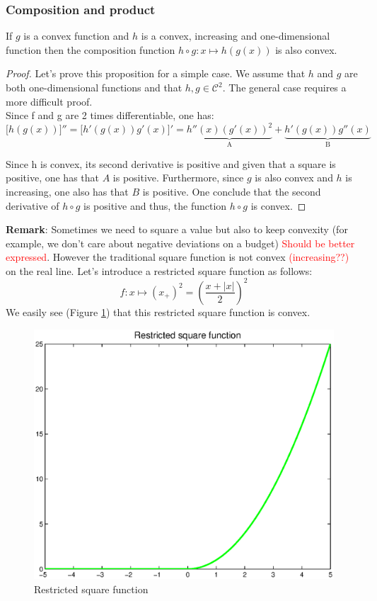 \subsubsection{Composition and product}
\begin{property}
If $g$ is a convex function and $h$ is a convex, increasing and one-dimensional function then the composition function $h \circ g: x \mapsto h(g(x))$ is also convex. 
\end{property}
\begin{proof}
Let's prove this proposition for a simple case. We assume that $h$ and $g$ are both one-dimensional functions and that $h,g \in \mathcal{C}^2$. The general case requires a more difficult proof. \\
Since f and g are 2 times differentiable, one has:
$$\big[ h(g(x))\big]'' = \big[ h'(g(x))g'(x)\big]' = \underbrace{h''(x)(g'(x))^2}_\text{A} + \underbrace{h'(g(x))g''(x)}_\text{B} $$

Since h is convex, its second derivative is positive and given that a square is positive, one has that $A$ is positive. Furthermore, since $g$ is also convex and $h$ is increasing, one also has that $B$ is positive. One conclude that the second derivative of $h \circ g$ is positive and thus, the function $h \circ g$ is convex. 
\end{proof}
\textbf{Remark}: Sometimes we need to square a value but also to keep convexity (for example, we don't care about negative deviations on a budget) \textcolor{red}{Should be better expressed}. However the traditional square function is not convex \textcolor{red}{(increasing??)} on the real line. Let's introduce a restricted square function as follows: 
$$f: x \mapsto (x_+)^2 = (\frac{x + |x|}{2})^2$$
We easily see (Figure \ref{restricted}) that this restricted square function is convex.

\begin{figure}[H]
\begin{center}
\includegraphics[scale=0.5]{./images/Course4_restrictedsquare.eps}
\caption{Restricted square function}
\label{restricted}
\end{center}
\end{figure}

